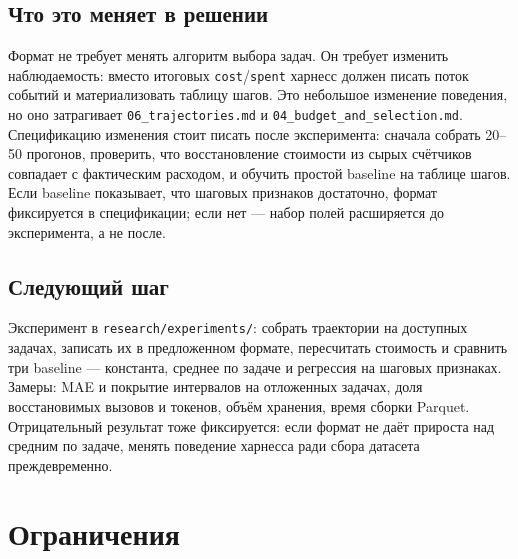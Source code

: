 \documentclass[11pt,a4paper]{article}
\begin{document}
\subsection{Что это меняет в решении}

Формат не требует менять алгоритм выбора задач. Он требует изменить
наблюдаемость: вместо итоговых \texttt{cost}/\texttt{spent} харнесс должен
писать поток событий и материализовать таблицу шагов. Это небольшое
изменение поведения, но оно затрагивает \texttt{06\_trajectories.md} и
\texttt{04\_budget\_and\_selection.md}. Спецификацию изменения стоит писать
после эксперимента: сначала собрать 20--50 прогонов, проверить, что
восстановление стоимости из сырых счётчиков совпадает с фактическим
расходом, и обучить простой baseline на таблице шагов. Если baseline
показывает, что шаговых признаков достаточно, формат фиксируется в
спецификации; если нет — набор полей расширяется до эксперимента, а не
после.

\subsection{Следующий шаг}

Эксперимент в \texttt{research/experiments/}: собрать траектории на
доступных задачах, записать их в предложенном формате, пересчитать
стоимость и сравнить три baseline — константа, среднее по задаче и
регрессия на шаговых признаках. Замеры: MAE и покрытие интервалов на
отложенных задачах, доля восстановимых вызовов и токенов, объём хранения,
время сборки Parquet. Отрицательный результат тоже фиксируется: если
формат не даёт прироста над средним по задаче, менять поведение харнесса
ради сбора датасета преждевременно.

\section{Ограничения}
\end{document}
